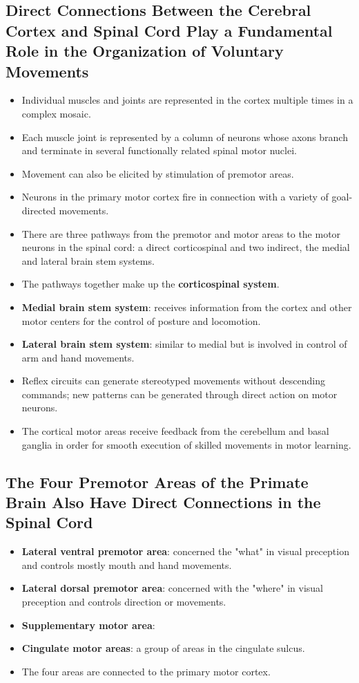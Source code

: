 \documentclass[12pt,a4paper]{article}
\begin{document}
\subsection{Direct Connections Between the Cerebral Cortex and Spinal Cord Play a Fundamental Role in the Organization of Voluntary Movements}
\begin{itemize}
    \item Individual muscles and joints are represented in the cortex multiple times in a complex mosaic.
    \item Each muscle joint is represented by a column of neurons whose axons branch and terminate in several functionally related spinal motor nuclei.
    \item Movement can also be elicited by stimulation of premotor areas.
    \item Neurons in the primary motor cortex fire in connection with a variety of goal-directed movements.
    \item There are three pathways from the premotor and motor areas to the motor neurons in the spinal cord: a direct corticospinal and two indirect, the medial and lateral brain stem systems.
    \item The pathways together make up the \textbf{corticospinal system}.
    \item \textbf{Medial brain stem system}: receives information from the cortex and other motor centers for the control of posture and locomotion.
    \item \textbf{Lateral brain stem system}: similar to medial but is involved in control of arm and hand movements.
    \item Reflex circuits can generate stereotyped movements without descending commands; new patterns can be generated through direct action on motor neurons.
    \item The cortical motor areas receive feedback from the cerebellum and basal ganglia in order for smooth execution of skilled movements in motor learning.
\end{itemize}

\subsection{The Four Premotor Areas of the Primate Brain Also Have Direct Connections in the Spinal Cord}
\begin{itemize}
    \item \textbf{Lateral ventral premotor area}: concerned the "what" in visual preception and controls mostly mouth and hand movements.
    \item \textbf{Lateral dorsal premotor area}: concerned with the "where" in visual preception and controls direction or movements.
    \item \textbf{Supplementary motor area}:
    \item \textbf{Cingulate motor areas}: a group of areas in the cingulate sulcus. 
    \item The four areas are connected to the primary motor cortex.
\end{itemize}
\end{document}
